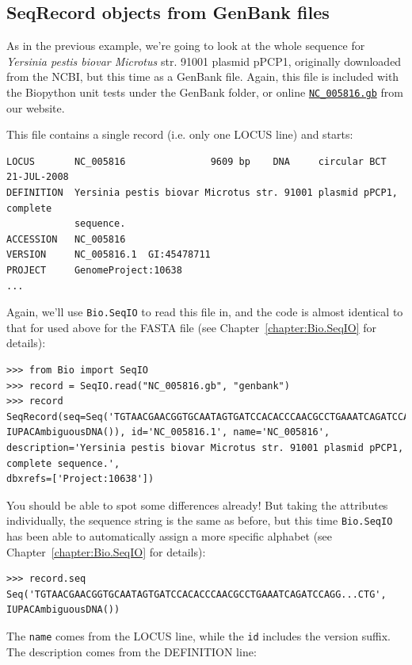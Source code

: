 \documentclass{report}
\begin{document}
\subsection{SeqRecord objects from GenBank files}

As in the previous example, we're going to look at the whole sequence for \textit{Yersinia pestis biovar Microtus} str. 91001 plasmid pPCP1, originally downloaded from the NCBI, but this time as a GenBank file.
Again, this file is included with the Biopython unit tests under the GenBank folder, or online \href{http://biopython.org/SRC/biopython/Tests/GenBank/NC_005816.gb}{\texttt{NC\_005816.gb}} from our website.

This file contains a single record (i.e. only one LOCUS line) and starts:
\begin{verbatim}
LOCUS       NC_005816               9609 bp    DNA     circular BCT 21-JUL-2008
DEFINITION  Yersinia pestis biovar Microtus str. 91001 plasmid pPCP1, complete
            sequence.
ACCESSION   NC_005816
VERSION     NC_005816.1  GI:45478711
PROJECT     GenomeProject:10638
...
\end{verbatim}

Again, we'll use \verb|Bio.SeqIO| to read this file in, and the code is almost identical to that for used above for the FASTA file (see Chapter~\ref{chapter:Bio.SeqIO} for details):

\begin{verbatim}
>>> from Bio import SeqIO
>>> record = SeqIO.read("NC_005816.gb", "genbank")
>>> record
SeqRecord(seq=Seq('TGTAACGAACGGTGCAATAGTGATCCACACCCAACGCCTGAAATCAGATCCAGG...CTG',
IUPACAmbiguousDNA()), id='NC_005816.1', name='NC_005816',
description='Yersinia pestis biovar Microtus str. 91001 plasmid pPCP1, complete sequence.',
dbxrefs=['Project:10638'])
\end{verbatim}

You should be able to spot some differences already! But taking the attributes individually,
the sequence string is the same as before, but this time \verb|Bio.SeqIO| has been able to automatically assign a more specific alphabet (see Chapter~\ref{chapter:Bio.SeqIO} for details):

\begin{verbatim}
>>> record.seq
Seq('TGTAACGAACGGTGCAATAGTGATCCACACCCAACGCCTGAAATCAGATCCAGG...CTG', IUPACAmbiguousDNA())
\end{verbatim}

The \verb|name| comes from the LOCUS line, while the \verb|id| includes the version suffix.
The description comes from the DEFINITION line:
\end{document}

